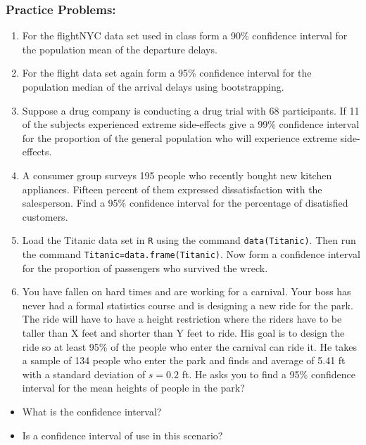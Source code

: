 \documentclass[
]{book}
\providecommand{\tightlist}{%
  \setlength{\itemsep}{0pt}\setlength{\parskip}{0pt}}
\theoremstyle{definition}
\theoremstyle{definition}
\theoremstyle{definition}
\theoremstyle{definition}
\theoremstyle{remark}
\begin{document}
\hypertarget{practice-problems-8}{%
\subsubsection{Practice Problems:}\label{practice-problems-8}}

\begin{enumerate}
\def\labelenumi{\arabic{enumi}.}
\tightlist
\item
  For the flightNYC data set used in class form a 90\% confidence interval for the population mean of the departure delays.
\item
  For the flight data set again form a 95\% confidence interval for the population median of the arrival delays using bootstrapping.
\item
  Suppose a drug company is conducting a drug trial with 68 participants. If 11 of the subjects experienced extreme side-effects give a 99\% confidence interval for the proportion of the general population who will experience extreme side-effects.
\item
  A consumer group surveys 195 people who recently bought new kitchen appliances. Fifteen percent of them expressed dissatisfaction with the salesperson. Find a 95\% confidence interval for the percentage of disatisfied customers.
\item
  Load the Titanic data set in \texttt{R} using the command \texttt{data(Titanic)}. Then run the command \texttt{Titanic=data.frame(Titanic)}. Now form a confidence interval for the proportion of passengers who survived the wreck.
\item
  You have fallen on hard times and are working for a carnival. Your boss has never had a formal statistics course and is designing a new ride for the park. The ride will have to have a height restriction where the riders have to be taller than X feet and shorter than Y feet to ride. His goal is to design the ride so at least 95\% of the people who enter the carnival can ride it. He takes a sample of 134 people who enter the park and finds and average of 5.41 ft with a standard deviation of \(s=0.2\) ft. He asks you to find a 95\% confidence interval for the mean heights of people in the park?
\end{enumerate}

\begin{itemize}
\tightlist
\item
  What is the confidence interval?
\item
  Is a confidence interval of use in this scenario?
\end{itemize}
\end{document}
